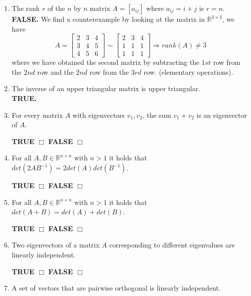 \documentclass[14pt]{report}
\begin{document}
\begin{enumerate}
\item The rank $r$ of the $n$ by $n$ matrix $A=[a_{ij}]$ where $a_{ij}=i+j$ is
  $r=n$.\\
  \textbf{FALSE.} We find a counterexample by looking at the matrix in
  $\mathbb{R}^{3\times 3}$, we
have\[A=\left[\begin{array}{ccc}2&3&4\\3&4&5\\4&5&6\end{array}\right]\sim\left[\begin{array}{ccc}2&3&4\\1&1&1\\1&1&1\end{array}\right]\Rightarrow
rank(A)\neq3\] where we have obtained the second matrix by subtracting the
$1st$ row from the $2nd$ row and the $2nd$ row from the $3rd$ row. (elementary
operations).




 

\item The inverse of an upper triangular matrix is upper triangular.\\
  \textbf{TRUE.}


\item For every  matrix $A$ with eigenvectors $v_1, v_2$, the sum $v_1 + v_2$ is an eigenvector of $A$. 

\quad \textbf{TRUE} $\Box$ \quad\textbf{FALSE} $\Box$ 

\item For all $A,B \in \mathbb{R}^{n \times n}$ with $n >1$ it holds that $det(2AB^{-1})=2det(A)det(B^{-1})$. 

\quad \textbf{TRUE} $\Box$ \quad\textbf{FALSE} $\Box$ 

\item For all $A,B \in \mathbb{R}^{n \times n}$ with $n >1$ it holds that $det(A+B)=det(A)+det(B)$.

 \quad \textbf{TRUE} $\Box$ \quad\textbf{FALSE} $\Box$ 


\item Two eigenvectors of a matrix $A$ corresponding to different eigenvalues  are linearly independent.

 \quad \textbf{TRUE} $\Box$ \quad\textbf{FALSE} $\Box$ 

\item A set of vectors that are pairwise orthogonal is 
  linearly independent. 


\end{enumerate}
\end{document}
